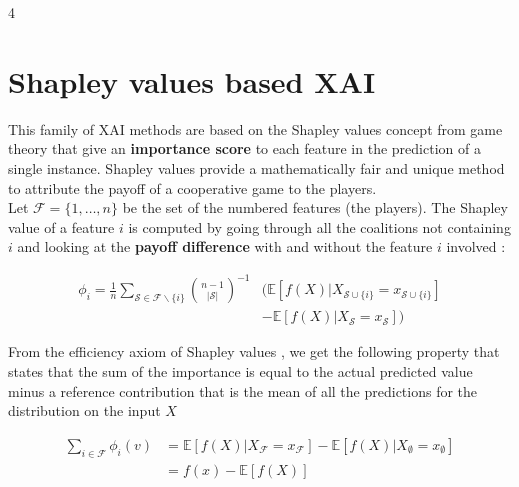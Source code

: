 \documentclass[a0,landscape]{a0poster}
\begin{document}
\begin{multicols}{4}
\vfill\null


\color{Black}

\section{Shapley values based XAI}

\color{DarkSlateGray}

\newcommand{\mS}{\mathcal{S}}
\newcommand{\mF}{\mathcal{F}}
\newcommand{\mP}{\mathcal{P}}
\newcommand{\mD}{\mathcal{D}}
\newcommand{\mbF}{\mathbb{F}}
\newcommand{\mbE}{\mathbb{E}}

This family of XAI methods are based on the Shapley values concept from game theory 
that give an \textbf{importance score} to each feature in the prediction of a single instance. Shapley values 
provide a mathematically fair and unique method to attribute the payoff of a cooperative game to the 
players. \\

Let $\mF = \{1, \dots, n\}$ be the set of the numbered features (the players). The Shapley value of a feature $i$ is computed by going through all the coalitions 
not containing $i$ and looking at the \textbf{payoff difference} with and without the feature $i$ involved \cite{merrick_explanation_2020} :

\begin{align*}
    \phi_i = \frac{1}{n} \sum_{\mS \in \mF\backslash\{i\}} \binom{n-1}{|\mS|}^{-1} & \bigl( \mbE[f(X) | X_{\mS\cup\{i\}} = x_{\mS\cup\{i\}}] \\
    & - \mbE[f(X) | X_{\mS}= x_{\mS}] \bigr)
\end{align*}

From the efficiency axiom of Shapley values \cite{fryer_shapley_2021}, we get the following property that states that the sum of the importance is equal to the actual predicted value minus a reference contribution 
that is the mean of all the predictions for the distribution on the input $X$

\begin{align*}
    \sum_{i \in \mF} \phi_i(v) &= \mbE[f(X) | X_{\mF} = x_{\mF}] - \mbE[f(X) | X_{\emptyset} = x_{\emptyset}] \\
    &= f(x) - \mbE[f(X)]
\end{align*}


\end{multicols}
\end{document}
